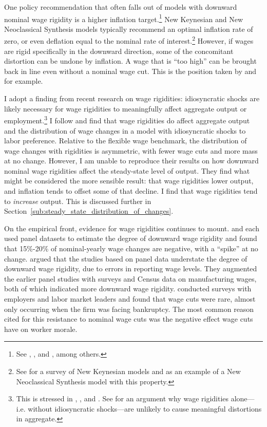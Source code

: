 \documentclass[12pt,a4paper]{scrartcl}            %
\begin{document}
One policy recommendation that often falls out of models with downward nominal wage rigidity is a higher inflation target.\footnote{
    See \cite{tobin_1972}, \cite{akerlof_dickens_perry_1996}, and \cite{kim_ruge-murcia_2011}, among others.
}
New Keynesian and New Neoclassical Synthesis models typically recommend an optimal inflation rate of zero, or even deflation equal to the nominal rate of interest.\footnote{
    See \cite{schmitt-grohe_uribe_2010} for a survey of New Keynesian models and \cite{goodfriend_king_2001} as an example of a New Neoclassical Synthesis model with this property.
}
However, if wages are rigid specifically in the downward direction, some of the concomitant distortion can be undone by inflation.
A wage that is ``too high'' can be brought back in line even without a nominal wage cut.
This is the position taken by \cite{tobin_1972} and \cite{akerlof_dickens_perry_1996} for example.

I adopt a finding from recent research on wage rigidities: idiosyncratic shocks are likely necessary for wage rigidities to meaningfully affect aggregate output or employment.\footnote{
    This is stressed in \cite{elsby_2009}, \cite{benigno_ricci_2011}, and \cite{daly_hobijn_2013}.
    See \cite{goodfriend_king_2001} for an argument why wage rigidities alone---i.e. without idiosyncratic shocks---are unlikely to cause meaningful distortions in aggregate.
}
I follow \cite{daly_hobijn_2013} and find that wage rigidities do affect aggregate output and the distribution of wage changes in a model with idiosyncratic shocks to labor preference.
Relative to the flexible wage benchmark, the distribution of wage changes with rigidities is asymmetric, with fewer wage cuts and more mass at no change.
However, I am unable to reproduce their results on how downward nominal wage rigidities affect the steady-state level of output.
They find what might be considered the more sensible result: that wage rigidities lower output, and inflation tends to offset some of that decline.
I find that wage rigidities tend to \emph{increase} output.
This is discussed further in Section~\eqref{sub:steady_state_distribution_of_changes}.

On the empirical front, evidence for wage rigidities continues to mount.
\cite{mclaughlin_1994} and \cite{card_hyslop_1997} each used panel datasets to estimate the degree of downward wage rigidity and found that 15\%-20\% of nominal-yearly wage changes are negative, with a ``spike'' at no change.
\cite{akerlof_dickens_perry_1996} argued that the studies based on panel data understate the degree of downward wage rigidity, due to errors in reporting wage levels.
They augmented the earlier panel studies with surveys and Census data on manufacturing wages, both of which indicated more downward wage rigidity.
\cite{bewley_1999} conducted surveys with employers and labor market leaders and found that wage cuts were rare, almost only occurring when the firm was facing bankruptcy.
The most common reason cited for this resistance to nominal wage cuts was the negative effect wage cuts have on worker morale.
\end{document}
